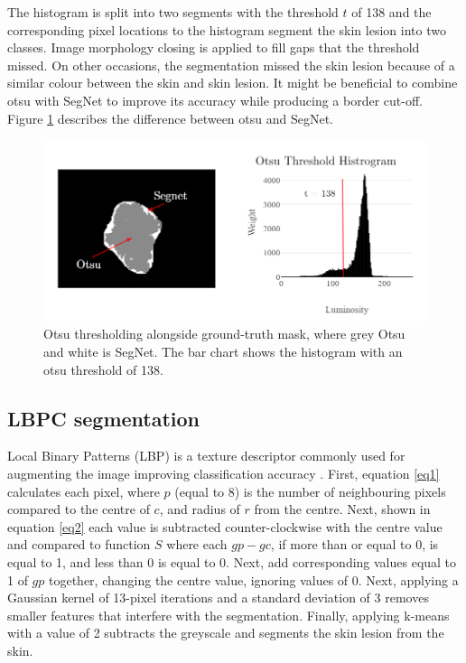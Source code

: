 The histogram is split into two segments with the threshold $t$ of 138 and the corresponding pixel locations to the histogram segment the skin lesion into two classes. Image morphology closing is applied to fill gaps that the threshold missed. On other occasions, the segmentation missed the skin lesion because of a similar colour between the skin and skin lesion. It might be beneficial to combine otsu with SegNet to improve its accuracy while producing a border cut-off. Figure \ref{otsu2} describes the difference between otsu and SegNet.

\begin{figure}
\centering
\includegraphics[scale=0.7]{images/otsu3.png}
\caption{Otsu thresholding alongside ground-truth mask, where grey Otsu and white is SegNet. The bar chart shows the histogram with an otsu threshold of 138.} \label{otsu2}
\end{figure}


\subsection{LBPC segmentation}

Local Binary Patterns (LBP) is a texture descriptor commonly used for augmenting the image improving classification accuracy \cite{Pereira2020, Kaya2016}. First, equation \ref{eq1} calculates each pixel, where $p$ (equal to 8) is the number of neighbouring pixels compared to the centre of $c$, and radius of $r$ from the centre. Next, shown in equation \ref{eq2} each value is subtracted counter-clockwise with the centre value and compared to function $S$ where each $gp - gc$, if more than or equal to 0, is equal to 1, and less than 0 is equal to 0. Next, add corresponding values equal to 1 of $gp$ together, changing the centre value, ignoring values of 0. Next, applying a Gaussian kernel of 13-pixel iterations and a standard deviation of 3 removes smaller features that interfere with the segmentation. Finally, applying k-means with a value of 2 subtracts the greyscale and segments the skin lesion from the skin.

